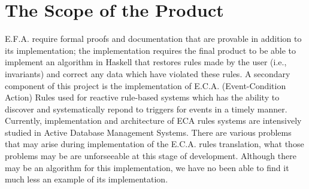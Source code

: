 \documentclass[12pt]{report}
\begin{document}
\section{The Scope of the Product}\label{sec:ScopeOfProduct}
E.F.A. require formal proofs and documentation that are provable in addition to its implementation; 
the implementation requires the final product to be able to implement an algorithm in Haskell that 
restores rules made by the user (i.e., invariants) and correct any data which have violated these 
rules. A secondary component of this project is the implementation of E.C.A. (Event-Condition 
Action) Rules used for reactive rule-based systems which has the ability to discover and 
systematically repond to triggers for events in a timely manner. 
Currently, implementation and architecture of ECA rules systems are intensively studied in Active 
Database Management Systems. %
There are various problems that may arise during implementation of the E.C.A. rules translation, 
what those problems may be are unforseeable at this stage of development. Although there may be an 
algorithm for this implementation, we have no been able to find it much less an example of its 
implementation.
\end{document}
